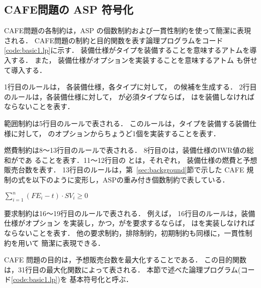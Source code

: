 \subsection{CAFE問題の ASP 符号化}

 

CAFE問題の各制約は，ASP の個数制約および一貫性制約を使って簡潔に表現される．
CAFE問題の制約と目的関数を表す論理プログラムをコード\ref{code:basic1.lp}に示す．
装備仕様がタイプを装備することを意味するアトムを導入する．
また，
装備仕様がオプションを実装することを意味するアトム
も併せて導入する．

1行目のルールは，
各装備仕様，各タイプに対して，
の候補を生成する．
2行目のルールは，各装備仕様に対して，
が必須タイプならば，
はを装備しなければならないことを表す．

範囲制約は5行目のルールで表される．
このルールは，タイプを装備する装備仕様に対して，
のオプションからちょうど1個を実装することを表す．

燃費制約は8〜13行目のルールで表される．
8行目のは，装備仕様のIWR値の総和がであ
ることを表す．11〜12行目の
とは，それぞれ，
装備仕様の燃費と予想販売台数を表す．
13行目のルールは，第~\ref{sec:background}節で示した
CAFE 規制の式を以下のように変形し，ASPの重み付き個数制約で表している．
\begin{center}
\(\sum_{i=1}^{n} (FE_{i}-t)\cdot SV_{i} \geq 0\)  
\end{center}

要求制約は16〜19行目のルールで表される．
例えば，
16行目のルールは，装備仕様がオプション
を実装し，かつ，がを要求するならば，
はを実装しなければならないことを表す．
他の要求制約，排除制約，初期制約も同様に，一貫性制約を用いて
簡潔に表現できる．

CAFE 問題の目的は，予想販売台数を最大化することである．
この目的関数は，31行目の最大化関数によって表される．
%
本節で述べた論理プログラム(コード\ref{code:basic1.lp})を
基本符号化と呼ぶ．

